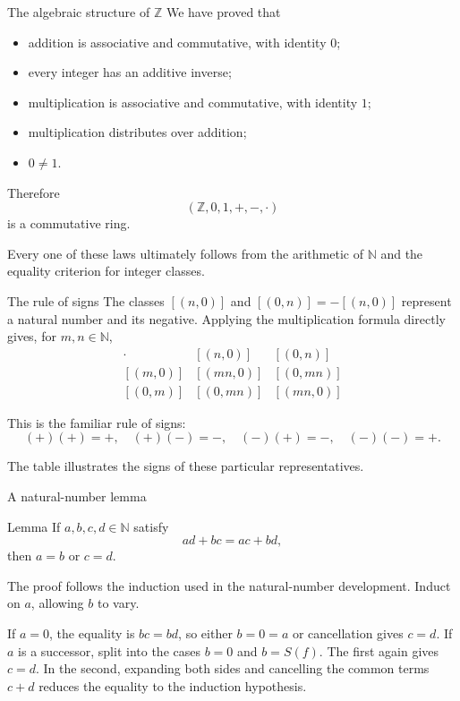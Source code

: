 \documentclass[aspectratio=169,11pt]{beamer}
\newcommand{\N}{\mathbb N}
\newcommand{\suc}[1]{S(#1)}
\newcommand{\Z}{\mathbb Z}
\newcommand{\cl}[2]{\left[(#1,#2)\right]}
\begin{document}
\begin{frame}{The algebraic structure of \(\Z\)}
  We have proved that
  \begin{itemize}
    \item addition is associative and commutative, with identity \(0\);
    \item every integer has an additive inverse;
    \item multiplication is associative and commutative, with identity \(1\);
    \item multiplication distributes over addition;
    \item \(0\ne1\).
  \end{itemize}

  Therefore
  \[
    (\Z,0,1,+,-,\cdot)
  \]
  is a \alert{commutative ring}.

  Every one of these laws ultimately follows from the arithmetic of \(\N\) and
  the equality criterion for integer classes.
\end{frame}

\begin{frame}{The rule of signs}
  The classes \(\cl{n}{0}\) and \(\cl{0}{n}=-\cl{n}{0}\) represent a
  natural number and its negative.  Applying the multiplication formula
  directly gives, for \(m,n\in\N\),
  \[
  \begin{array}{c|cc}
    \cdot & \cl{n}{0} & \cl{0}{n}\\ \hline
    \cl{m}{0} & \cl{mn}{0} & \cl{0}{mn}\\[0.4em]
    \cl{0}{m} & \cl{0}{mn} & \cl{mn}{0}
  \end{array}
  \]

  This is the familiar rule of signs:
  \[
    (+)(+)=+,\quad (+)(-)=-,\quad (-)(+)=-,\quad (-)(-)=+.
  \]

  The table illustrates the signs of these particular representatives.
\end{frame}

\begin{frame}{A natural-number lemma}
  \small
  \begin{block}{Lemma}
    If \(a,b,c,d\in\N\) satisfy
    \[
      ad+bc=ac+bd,
    \]
    then \(a=b\) or \(c=d\).
  \end{block}

  The proof follows the induction used in the natural-number development.
  Induct on \(a\), allowing \(b\) to vary.

  If \(a=0\), the equality is \(bc=bd\), so either \(b=0=a\) or
  cancellation gives \(c=d\).  If \(a\) is a successor, split into the cases
  \(b=0\) and \(b=\suc f\).  The first again gives \(c=d\).  In the second,
  expanding both sides and cancelling the common terms \(c+d\) reduces the
  equality to the induction hypothesis.
\end{frame}
\end{document}

